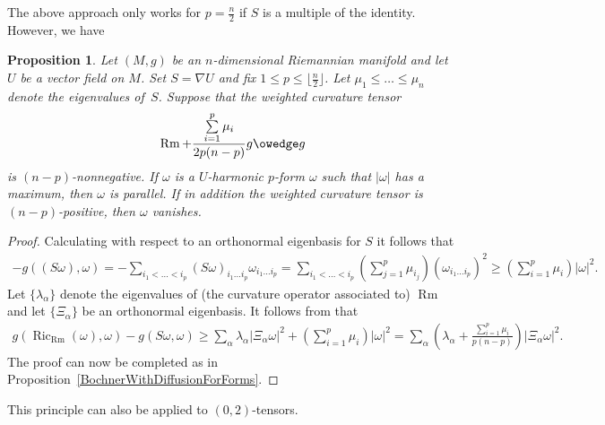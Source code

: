 \documentclass[pdftex]{sigma}
\numberwithin{equation}{section}
\newtheorem{Proposition}[Theorem]{Proposition}
{ \theoremstyle{definition}
\newtheorem{Remark}[Theorem]{Remark} }
\newcommand{\Ric} {\operatorname{Ric}}
\newcommand{\Rm} {\operatorname{Rm}}
\begin{document}
The above approach only works for $p = \frac{n}{2}$ if $S$ is a multiple of the identity. However, we have

\begin{Proposition}
Let $(M,g)$ be an $n$-dimensional Riemannian manifold and let $U$ be a vector field on $M$. Set $S= \nabla U$ and fix $1 \leq p \leq \big\lfloor \frac{n}{2}\big\rfloor$. Let $\mu_1 \leq \dots \leq \mu_n$ denote the eigenvalues of~$S$. Suppose that the weighted curvature tensor
\begin{gather*}
\Rm + \frac{\sum\limits_{i=1}^p \mu_i}{2p(n-p)} g \owedge g
\end{gather*}
is $(n-p)$-nonnegative. If $\omega$ is a $U$-harmonic $p$-form $\omega$ such that $|\omega|$ has a maximum, then $\omega$ is parallel. If in addition the weighted curvature tensor is $(n-p)$-positive, then $\omega$ vanishes.
\end{Proposition}
\begin{proof}Calculating with respect to an orthonormal eigenbasis for $S$ it follows that
\begin{gather*}
- g( (S \omega), \omega) = - \sum_{i_1 < \dots < i_p} (S \omega )_{i_1 \dots i_p} \omega_{i_1 \dots i_p}
 = \sum_{i_1 < \dots < i_p} \left( \sum_{j=1}^p \mu_{i_j} \right) ( \omega_{i_1 \dots i_p } )^2
 \geq \left( \sum_{i=1}^p \mu_{i} \right) | \omega |^2.
\end{gather*}
Let $\lbrace \lambda_{\alpha} \rbrace$ denote the eigenvalues of
(the curvature operator associated to)
$\Rm$ and let $\lbrace \Xi_{\alpha} \rbrace$ be an orthonormal eigenbasis. It follows from \cite[Proposition 1.6]{PetersenWinkBochner} that
\begin{align*}
g( \Ric_{\Rm}( \omega), \omega ) - g( S \omega, \omega)  \geq \sum_{\alpha} \lambda_{\alpha} | \Xi_{\alpha} \omega |^2 + \left( \sum_{i=1}^p \mu_i \!\right) | \omega |^2
  = \sum_{\alpha} \!\left(\! \lambda_{\alpha} + \frac{\sum\limits_{i=1}^p \mu_i}{p(n-p)}\! \right) | \Xi_{\alpha} \omega |^2.
\end{align*}
The proof can now be completed as in Proposition~\ref{BochnerWithDiffusionForForms}.
\end{proof}

This principle can also be applied to $(0,2)$-tensors.
\end{document}
